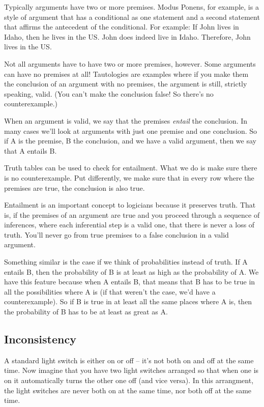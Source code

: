 \documentclass[]{tufte-book}
\begin{document}
Typically arguments have two or more premises. Modus Ponens, for example, is a style of argument that has a conditional as one statement and a second statement that affirms the antecedent of the conditional. For example: If John lives in Idaho, then he lives in the US. John does indeed live in Idaho. Therefore, John lives in the US.

Not all arguments have to have two or more premises, however. Some arguments can have no premises at all! Tautologies are examples where if you make them the conclusion of an argument with no premises, the argument is still, strictly speaking, valid. (You can't make the conclusion false! So there's no counterexample.)

When an argument is valid, we say that the premises \emph{entail} the conclusion. In many cases we'll look at arguments with just one premise and one conclusion. So if A is the premise, B the conclusion, and we have a valid argument, then we say that A entails B.

Truth tables can be used to check for entailment. What we do is make sure there is no counterexample. Put differently, we make sure that in every row where the premises are true, the conclusion is also true.

Entailment is an important concept to logicians because it preserves truth. That is, if the premises of an argument are true and you proceed through a sequence of inferences, where each inferential step is a valid one, that there is never a loss of truth. You'll never go from true premises to a false conclusion in a valid argument.

Something similar is the case if we think of probabilities instead of truth. If A entails B, then the probability of B is at least as high as the probability of A. We have this feature because when A entails B, that means that B has to be true in all the possibilities where A is (if that weren't the case, we'd have a counterexample). So if B is true in at least all the same places where A is, then the probability of B has to be at least as great as A.

\hypertarget{inconsistency}{%
\subsection{Inconsistency}\label{inconsistency}}

A standard light switch is either on or off -- it's not both on and off at the same time. Now imagine that you have two light switches arranged so that when one is on it automatically turns the other one off (and vice versa). In this arrangment, the light switches are never both on at the same time, nor both off at the same time.
\end{document}
